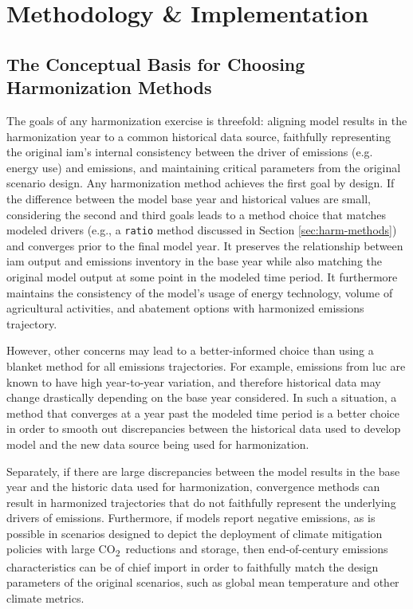\documentclass[review]{elsarticle}
\newcommand{\code}[1]{\lstinline[basicstyle=\ttfamily\color{black}]|#1|}
\newcommand{\cotwo}{CO\textsubscript{2}~}
\begin{document}
\section{Methodology \& Implementation}\label{sec:meths}

\subsection{The Conceptual Basis for Choosing Harmonization Methods}\label{sec:concept}

The goals of any harmonization exercise is threefold: aligning model results in
the harmonization year to a common historical data source, faithfully
representing the original \gls{iam}’s internal consistency between the driver of
emissions (e.g. energy use) and emissions, and maintaining critical parameters
from the original scenario design. Any harmonization method achieves the first
goal by design. If the difference between the model base year and historical
values are small, considering the second and third goals leads to a method
choice that matches modeled drivers (e.g., a \code{ratio} method discussed in
Section \ref{sec:harm-methods}) and converges prior to the final model year. It
preserves the relationship between \gls{iam} output and emissions inventory in
the base year while also matching the original model output at some point in the
modeled time period. It furthermore maintains the consistency of the model's
usage of energy technology, volume of agricultural activities, and abatement
options with harmonized emissions trajectory.

However, other concerns may lead to a better-informed choice than using a
blanket method for all emissions trajectories. For example, emissions from
\gls{luc} are known to have high year-to-year variation, and therefore
historical data may change drastically depending on the base year considered. In
such a situation, a method that converges at a year past the modeled time period
is a better choice in order to smooth out discrepancies between the historical
data used to develop model and the new data source being used for harmonization.

Separately, if there are large discrepancies between the model results in the
base year and the historic data used for harmonization, convergence methods can
result in harmonized trajectories that do not faithfully represent the
underlying drivers of emissions. Furthermore, if models report negative
emissions, as is possible in scenarios designed to depict the deployment of
climate mitigation policies with large \cotwo reductions and storage,
then end-of-century emissions characteristics can be of chief import in order to
faithfully match the design parameters of the original scenarios, such as global
mean temperature and other climate metrics.
\end{document}
